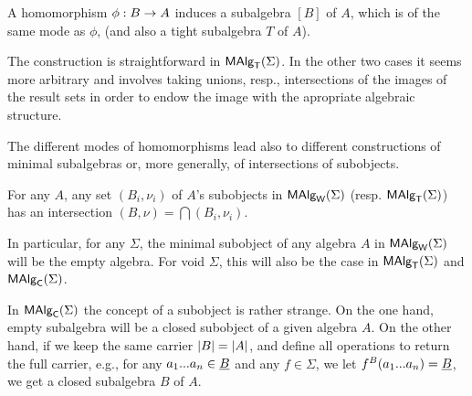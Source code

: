 \documentclass[10pt]{article}
\begin{document}


\begin{Prop}
\label{le:subalgs}
A homomorphism $\phi:B\rightarrow A$ induces a subalgebra $[B]$ of $A$,
which is of the same mode as $\phi$, (and also a tight subalgebra $T$ of
$A$).
\end{Prop}

\noindent
The construction is straightforward in $\mbox{\rm\sf MAlg}_{\sf T}(\Sigma)$. In the other two cases
it seems more arbitrary and involves taking unions, resp., intersections of
the images of the result sets in order to endow the image with the 
apropriate algebraic structure.

The different modes of homomorphisms lead also to different
constructions of minimal subalgebras or, more generally, of
intersections of subobjects.

\begin{Prop}
\label{le:MASlintersect}
For any $A$, any set $(B_i,\nu_i)$ of $A$'s subobjects in $\mbox{\rm\sf MAlg}_{\sf W}(\Sigma)$
(resp. $\mbox{\rm\sf MAlg}_{\sf T}(\Sigma)$) has an intersection $(B,\nu)=\bigcap (B_i,\nu_i)$.
\end{Prop}

\noindent
In particular, for any $\Sigma$, the minimal subobject of any algebra
$A$ in $\mbox{\rm\sf MAlg}_{\sf W}(\Sigma)$ will be the empty algebra. For void $\Sigma$, this
will also be the case in $\mbox{\rm\sf MAlg}_{\sf T}(\Sigma)$ and $\mbox{\rm\sf MAlg}_{\sf C}(\Sigma)$.


In $\mbox{\rm\sf MAlg}_{\sf C}(\Sigma)$ the concept of a subobject is rather strange.  
On the one hand, empty subalgebra will be a
closed subobject of a given algebra $A$. On the other hand, if we keep
the same carrier $|B|=|A|$, and define all operations to
return the full carrier, e.g., for any $a_{1}...a_{n}\in\underline {B}$
and any $f\in\Sigma$, we let $f^B(a_{1}...a_{n})=\underline {B}$, we
get a closed subalgebra $B$ of $A$.
\end{document}
